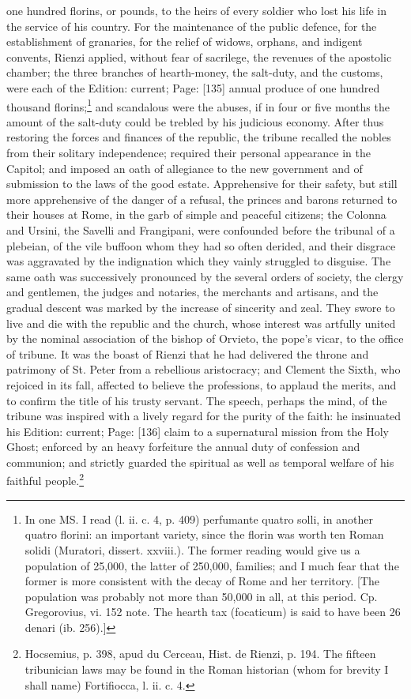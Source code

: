 one hundred florins, or pounds, to the heirs of every soldier who lost his life in the service of his country. For the maintenance of the public defence, for the establishment of granaries, for the relief of widows, orphans, and indigent convents, Rienzi applied, without fear of sacrilege, the revenues of the apostolic chamber; the three branches of hearth-money, the salt-duty, and the customs, were each of the Edition: current; Page: [135] annual produce of one hundred thousand florins;\footnote{In one MS. I read (l. ii. c. 4, p. 409) perfumante quatro solli, in another quatro florini: an important variety, since the florin was worth ten Roman solidi (Muratori, dissert. xxviii.). The former reading would give us a population of 25,000, the latter of 250,000, families; and I much fear that the former is more consistent with the decay of Rome and her territory. [The population was probably not more than 50,000 in all, at this period. Cp. Gregorovius, vi. 152 note. The hearth tax (focaticum) is said to have been 26 denari (ib. 256).]} and scandalous were the abuses, if in four or five months the amount of the salt-duty could be trebled by his judicious economy. After thus restoring the forces and finances of the republic, the tribune recalled the nobles from their solitary independence; required their personal appearance in the Capitol; and imposed an oath of allegiance to the new government and of submission to the laws of the good estate. Apprehensive for their safety, but still more apprehensive of the danger of a refusal, the princes and barons returned to their houses at Rome, in the garb of simple and peaceful citizens; the Colonna and Ursini, the Savelli and Frangipani, were confounded before the tribunal of a plebeian, of the vile buffoon whom they had so often derided, and their disgrace was aggravated by the indignation which they vainly struggled to disguise. The same oath was successively pronounced by the several orders of society, the clergy and gentlemen, the judges and notaries, the merchants and artisans, and the gradual descent was marked by the increase of sincerity and zeal. They swore to live and die with the republic and the church, whose interest was artfully united by the nominal association of the bishop of Orvieto, the pope\texthebrew{}’s vicar, to the office of tribune. It was the boast of Rienzi that he had delivered the throne and patrimony of St. Peter from a rebellious aristocracy; and Clement the Sixth, who rejoiced in its fall, affected to believe the professions, to applaud the merits, and to confirm the title of his trusty servant. The speech, perhaps the mind, of the tribune was inspired with a lively regard for the purity of the faith: he insinuated his Edition: current; Page: [136] claim to a supernatural mission from the Holy Ghost; enforced by an heavy forfeiture the annual duty of confession and communion; and strictly guarded the spiritual as well as temporal welfare of his faithful people.\footnote{Hocsemius, p. 398, apud du Cerceau, Hist. de Rienzi, p. 194. The fifteen tribunician laws may be found in the Roman historian (whom for brevity I shall name) Fortifiocca, l. ii. c. 4.}

